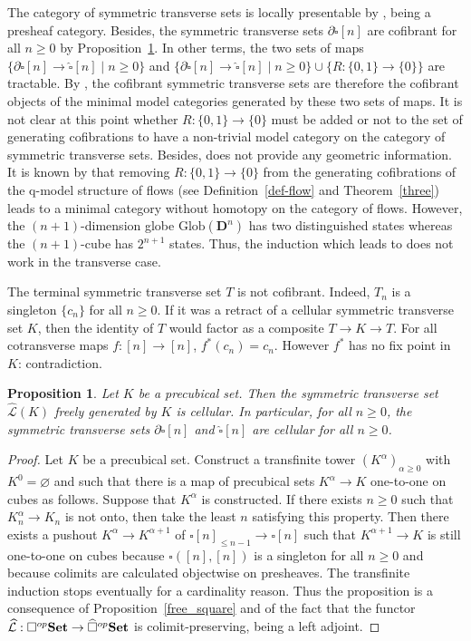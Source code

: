 \documentclass[a4paper,12pt]{amsart}
\newcommand{\de}{\partial}
\newtheorem{prop}[thm]{Proposition}
\newcommand{\bp}{\begin{prop}}
\newcommand{\ep}{\end{prop}}
\newcommand{\bpf}{\begin{proof}}
\newcommand{\epf}{\end{proof}}
\theoremstyle{definition}
\renewcommand{\leq}{\leqslant}
\renewcommand{\geq}{\geqslant}
\newcommand{\brm}[1]{{\rm{\mathbf{#1}}}}
\newcommand{\set}{{\brm{Set}}}
\newcommand{\glob}{{\mathrm{Glob}}}
\newcommand{\Di}{\mathbf{D}}
\begin{document}
The category of symmetric transverse sets is locally presentable by \cite[Corollary~1.54]{TheBook}, being a presheaf category. Besides, the symmetric transverse sets $\de\widehat{\square}[n]$ are cofibrant for all $n\geq 0$ by Proposition~\ref{cp_cofibrant}. In other terms, the two sets of maps $\{\de\widehat{\square}[n]\to \widehat{\square}[n]\mid n\geq 0\}$ and $\{\de\widehat{\square}[n]\to \widehat{\square}[n]\mid n\geq 0\} \cup \{R:\{0,1\}\to \{0\}\}$ are tractable. By \cite[Theorem~1.4]{henry2020minimal}, the cofibrant symmetric transverse sets are therefore the cofibrant objects of the minimal model categories generated by these two sets of maps. It is not clear at this point whether $R:\{0,1\}\to \{0\}$ must be added or not to the set of generating cofibrations to have a non-trivial model category on the category of symmetric transverse sets. Besides, \cite[Theorem~1.4]{henry2020minimal} does not provide any geometric information. It is known by \cite[Corollary~4.10]{Nonunital} that removing $R:\{0,1\}\to \{0\}$ from the generating cofibrations of the q-model structure of flows (see Definition~\ref{def-flow} and Theorem~\ref{three}) leads to a minimal category without homotopy on the category of flows. However, the $(n+1)$-dimension globe $\glob(\Di^n)$ has two distinguished states whereas the $(n+1)$-cube has $2^{n+1}$ states. Thus, the induction which leads to \cite[Corollary~4.10]{Nonunital} does not work in the transverse case.

The terminal symmetric transverse set $T$ is not cofibrant. Indeed, $T_n$ is a singleton $\{c_n\}$ for all $n\geq 0$. If it was a retract of a cellular symmetric transverse set $K$, then the identity of $T$ would factor as a composite $T\to K\to T$. For all cotransverse maps $f:[n]\to [n]$, $f^*(c_n)=c_n$. However $f^*$ has no fix point in $K$: contradiction.

\bp \label{cp_cofibrant}
Let $K$ be a precubical set. Then the symmetric transverse set $\widehat{\mathcal{L}}(K)$ freely generated by $K$ is cellular. In particular, for all $n\geq 0$, the symmetric transverse sets $\de\widehat{\square}[n]$ and $\widehat{\square}[n]$ are cellular for all $n\geq 0$. 
\ep

\bpf
Let $K$ be a precubical set. Construct a transfinite tower $(K^\alpha)_{\alpha\geq 0}$ with $K^0=\varnothing$ and such that there is a map of precubical sets $K^\alpha\to K$ one-to-one on cubes as follows. Suppose that $K^\alpha$ is constructed. If there exists $n\geq 0$ such that $K^\alpha_n\to K_n$ is not onto, then take the least $n$ satisfying this property. Then there exists a pushout $K^\alpha \to K^{\alpha+1}$ of $\square[n]_{\leq n-1} \to \square[n]$ such that $K^{\alpha+1}\to K$ is still one-to-one on cubes because $\square([n],[n])$ is a singleton for all $n\geq 0$ and because colimits are calculated objectwise on presheaves. The transfinite induction stops eventually for a cardinality reason. Thus the proposition is a consequence of Proposition~\ref{free_square} and of the fact that the functor $\widehat{\mathcal{L}}:\square^{op}\set \to \widehat{\square}^{op}\set$ is colimit-preserving, being a left adjoint. 
\epf
\end{document}
